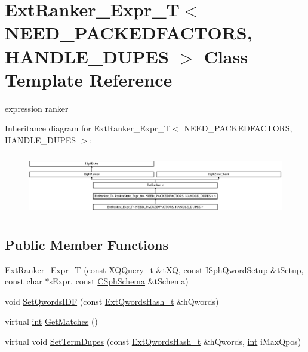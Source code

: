 \hypertarget{classExtRanker__Expr__T}{\section{Ext\-Ranker\-\_\-\-Expr\-\_\-\-T$<$ N\-E\-E\-D\-\_\-\-P\-A\-C\-K\-E\-D\-F\-A\-C\-T\-O\-R\-S, H\-A\-N\-D\-L\-E\-\_\-\-D\-U\-P\-E\-S $>$ Class Template Reference}
\label{classExtRanker__Expr__T}
}


expression ranker  


Inheritance diagram for Ext\-Ranker\-\_\-\-Expr\-\_\-\-T$<$ N\-E\-E\-D\-\_\-\-P\-A\-C\-K\-E\-D\-F\-A\-C\-T\-O\-R\-S, H\-A\-N\-D\-L\-E\-\_\-\-D\-U\-P\-E\-S $>$\-:\begin{figure}[H]
\begin{center}
\leavevmode
\includegraphics[height=2.707930cm]{classExtRanker__Expr__T}
\end{center}
\end{figure}
\subsection*{Public Member Functions}
\begin{DoxyCompactItemize}
\item 
\hyperlink{classExtRanker__Expr__T_ac752f6ed260c5508c062e03ae91fe251}{Ext\-Ranker\-\_\-\-Expr\-\_\-\-T} (const \hyperlink{structXQQuery__t}{X\-Q\-Query\-\_\-t} \&t\-X\-Q, const \hyperlink{classISphQwordSetup}{I\-Sph\-Qword\-Setup} \&t\-Setup, const char $\ast$s\-Expr, const \hyperlink{classCSphSchema}{C\-Sph\-Schema} \&t\-Schema)
\item 
void \hyperlink{classExtRanker__Expr__T_a6091d1464ab573a470960268e0235eb7}{Set\-Qwords\-I\-D\-F} (const \hyperlink{sphinxsearch_8cpp_a814fc096e1ffb29d072d79b72b702fe6}{Ext\-Qwords\-Hash\-\_\-t} \&h\-Qwords)
\item 
virtual \hyperlink{sphinxexpr_8cpp_a4a26e8f9cb8b736e0c4cbf4d16de985e}{int} \hyperlink{classExtRanker__Expr__T_a65971cb8c963aecc2860fff216fe0761}{Get\-Matches} ()
\item 
virtual void \hyperlink{classExtRanker__Expr__T_ad42b282b80da76809a420476dddcefc1}{Set\-Term\-Dupes} (const \hyperlink{sphinxsearch_8cpp_a814fc096e1ffb29d072d79b72b702fe6}{Ext\-Qwords\-Hash\-\_\-t} \&h\-Qwords, \hyperlink{sphinxexpr_8cpp_a4a26e8f9cb8b736e0c4cbf4d16de985e}{int} i\-Max\-Qpos)
\end{DoxyCompactItemize}
